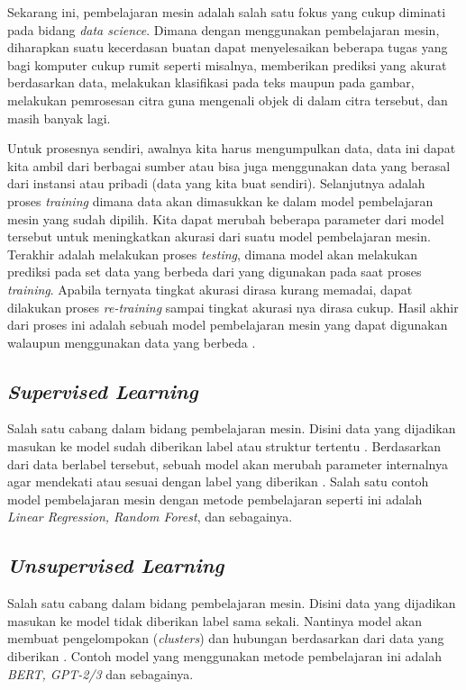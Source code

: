 Sekarang ini, pembelajaran mesin adalah salah satu fokus yang cukup diminati pada bidang \textit{data science}. Dimana dengan menggunakan pembelajaran mesin, diharapkan suatu kecerdasan buatan dapat menyelesaikan beberapa tugas yang bagi komputer cukup rumit seperti misalnya, memberikan prediksi yang akurat berdasarkan data, melakukan klasifikasi pada teks maupun pada gambar, melakukan pemrosesan citra guna mengenali objek di dalam citra tersebut, dan masih banyak lagi.

Untuk prosesnya sendiri, awalnya kita harus mengumpulkan data, data ini dapat kita ambil dari  berbagai sumber atau bisa juga menggunakan data yang berasal dari instansi atau pribadi (data yang kita buat sendiri). Selanjutnya adalah proses \textit{training} dimana data akan dimasukkan ke dalam model pembelajaran mesin yang sudah dipilih. Kita dapat merubah beberapa parameter dari model tersebut untuk meningkatkan akurasi dari suatu model pembelajaran mesin. Terakhir adalah melakukan proses \textit{testing}, dimana model akan melakukan prediksi pada set data yang berbeda dari yang digunakan pada saat proses \textit{training}. Apabila ternyata tingkat akurasi dirasa kurang memadai, dapat dilakukan proses \textit{re-training} sampai tingkat akurasi nya dirasa cukup. Hasil akhir dari proses ini adalah sebuah model pembelajaran mesin yang dapat digunakan walaupun menggunakan data yang berbeda \cite{mit_ml_expl}.

\subsection{\textit{Supervised Learning}}

Salah satu cabang dalam bidang pembelajaran mesin. Disini data yang dijadikan masukan ke model sudah diberikan label atau struktur tertentu \cite{ms_ml_expl}. Berdasarkan dari data berlabel tersebut, sebuah model akan merubah parameter internalnya agar mendekati atau sesuai dengan label yang diberikan \cite{ibm_ml_expl}. Salah satu contoh model pembelajaran mesin dengan metode pembelajaran seperti ini adalah \textit{Linear Regression, Random Forest}, dan sebagainya.

\subsection{\textit{Unsupervised Learning}}

Salah satu cabang dalam bidang pembelajaran mesin. Disini data yang dijadikan masukan ke model tidak diberikan label sama sekali. Nantinya model akan membuat pengelompokan (\textit{clusters}) dan hubungan berdasarkan dari data yang diberikan \cite{mit_ml_expl}. Contoh model yang menggunakan metode pembelajaran ini adalah \textit{BERT, GPT-2/3} dan sebagainya.

